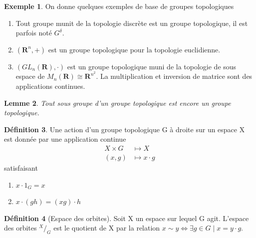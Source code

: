 \documentclass[12pt]{book}
\newtheorem{lemma}{Lemme}[section]
\theoremstyle{definition}
\newtheorem{definition}[lemma]{Définition}
\newtheorem{example}[lemma]{Exemple}
\theoremstyle{remark}
\newcommand*\quot[2]{{^{\textstyle #1}\big/_{\textstyle #2}}}
\begin{document}
	\begin{example} On donne quelques exemples de base de groupes topologiques \\
		\begin{enumerate}
			\item Tout groupe munit de la topologie discrète est un groupe topologique, il est parfois noté $G^{\delta}$.
			\item $(\mathbf{R}^n,+)$ est un groupe topologique pour la topologie euclidienne.
			\item $(GL_n(\mathbf{R}),\cdot)$ est un groupe topologique muni de la topologie de sous espace de $M_n(\mathbf{R}) \cong \mathbf{R}^{n^2}$. La multiplication et inversion de matrice sont des applications continues. 
		\end{enumerate}	
	\end{example}

	\begin{lemma}
		Tout sous groupe d'un groupe topologique est encore un groupe topologique.
	\end{lemma}

	\begin{definition}
		Une action d'un groupe topologique G à droite sur un espace X est donnée par une application continue
		\begin{align*}
			X \times G &\longmapsto X \\
			(x,g) &\longmapsto x\cdot g
		\end{align*} satisfaisant 

		\begin{center}
			\begin{enumerate}
				\item $x \cdot 1_G = x$
				\item $x \cdot (gh) = (xg)\cdot h$
			\end{enumerate}
		\end{center}
	\end{definition}

	\begin{definition}[Espace des orbites]
		Soit X un espace sur lequel G agit. L'espace des orbites $\quot{X}{G}$ est le quotient de X par la relation $x \sim y \iff \exists g \in G \;|\; x = y \cdot g$.
	\end{definition}
\end{document}
